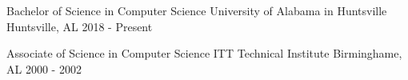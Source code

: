 
\begin{cventries}
  \cventry
    {Bachelor of Science in Computer Science} %
    {University of Alabama in Huntsville} %
    {Huntsville, AL} %
    {2018 - Present} %
    {}

  \cventry
    {Associate of Science in Computer Science} %
    {ITT Technical Institute} %
    {Birminghame, AL} %
    {2000 - 2002} %
    {}

\end{cventries}

